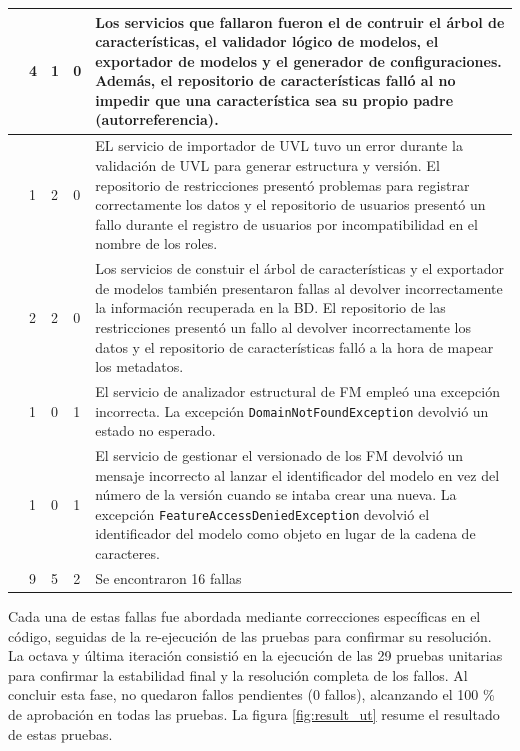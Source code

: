 \begin{longtable}{|p{3.0cm}|p{2.0cm}|p{2.0cm}|p{2.0cm}|p{5.0cm}|}
    {Lógica de negocio:} & 4 & 1 & 0 &
    Los servicios que fallaron fueron el de contruir el árbol de características, 
    el validador lógico de modelos, el exportador de modelos y el generador de configuraciones. Además, el repositorio
    de características falló al no impedir que una característica sea su propio padre (autorreferencia).
    \\
	\hline
    {Validación de datos:} & 1 & 2 & 0 & 
    EL servicio de importador de \ac{UVL} tuvo un error durante la validación de \ac{UVL} para generar estructura y versión. 
    El repositorio de restricciones presentó problemas para registrar correctamente los datos y el repositorio de usuarios 
    presentó un fallo durante el registro de usuarios por incompatibilidad en el nombre de los roles.
    \\
	\hline
    {Escritura/lectura de la \ac{BD}:} & 2 & 2 & 0 & 
    Los servicios de constuir el árbol de características y el exportador de modelos también presentaron 
    fallas al devolver incorrectamente la información recuperada en la \ac{BD}. 
    El repositorio de las restricciones presentó 
    un fallo al devolver incorrectamente los datos y el repositorio de características falló a la hora de mapear los metadatos. 
    \\
	\hline
    {Inconsistencia en las excepciones:} & 1 & 0 & 1 & 
    El servicio de analizador estructural de \ac{FM} empleó una excepción incorrecta. La excepción 
    \texttt{DomainNotFoundException} devolvió un estado no esperado.
    \\
	\hline
    {Respuesta de las excepciones:} & 1 & 0 & 1 & 
    El servicio de gestionar el versionado de los \ac{FM} devolvió un mensaje incorrecto al 
    lanzar el identificador del modelo en vez del número de la versión cuando se intaba crear una nueva. La excepción 
    \texttt{FeatureAccessDeniedException} devolvió el identificador del modelo como objeto en lugar de la cadena de caracteres.
    \\
	\hline
    {Total:} & 9 & 5 & 2 & Se encontraron 16 fallas \\
	\hline
\end{longtable}

Cada una de estas fallas fue abordada mediante correcciones específicas en el código, seguidas de la 
re-ejecución de las pruebas para confirmar su resolución.
La octava y última iteración consistió en la ejecución de las 29 pruebas unitarias para confirmar la
estabilidad final y la resolución completa de los fallos. Al concluir esta fase, no quedaron fallos pendientes
(0 fallos), alcanzando el 100 \% de aprobación en todas las pruebas. 
La figura \ref{fig:result_ut} resume el resultado de estas pruebas.

